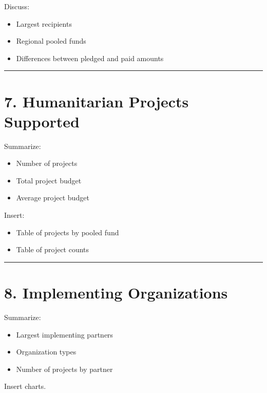\documentclass[
  11pt,
  letterpaper,
  DIV=11,
  numbers=noendperiod]{scrartcl}
\providecommand{\tightlist}{%
  \setlength{\itemsep}{0pt}\setlength{\parskip}{0pt}}
\begin{document}
Discuss:

\begin{itemize}
\tightlist
\item
  Largest recipients
\item
  Regional pooled funds
\item
  Differences between pledged and paid amounts
\end{itemize}

\begin{center}\rule{0.5\linewidth}{0.5pt}\end{center}

\section{7. Humanitarian Projects
Supported}\label{humanitarian-projects-supported}

Summarize:

\begin{itemize}
\tightlist
\item
  Number of projects
\item
  Total project budget
\item
  Average project budget
\end{itemize}

Insert:

\begin{itemize}
\tightlist
\item
  Table of projects by pooled fund
\item
  Table of project counts
\end{itemize}

\begin{center}\rule{0.5\linewidth}{0.5pt}\end{center}

\section{8. Implementing
Organizations}\label{implementing-organizations}

Summarize:

\begin{itemize}
\tightlist
\item
  Largest implementing partners
\item
  Organization types
\item
  Number of projects by partner
\end{itemize}

Insert charts.
\end{document}

